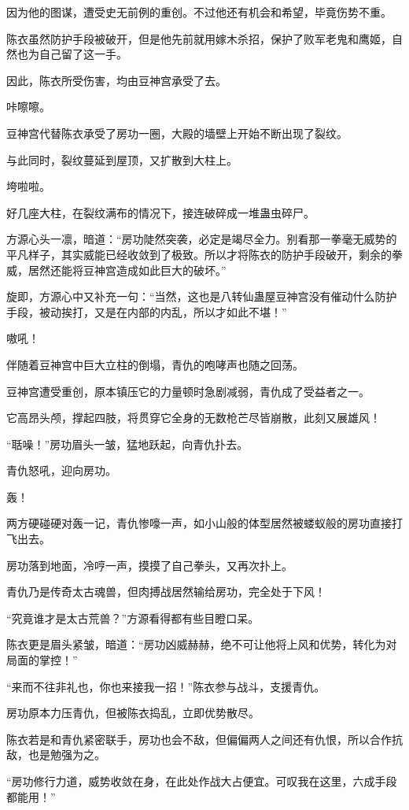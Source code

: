 \begin{this_body}
因为他的图谋，遭受史无前例的重创。不过他还有机会和希望，毕竟伤势不重。

陈衣虽然防护手段被破开，但是他先前就用嫁木杀招，保护了败军老鬼和鹰姬，自然也为自己留了这一手。

因此，陈衣所受伤害，均由豆神宫承受了去。

咔嚓嚓。

豆神宫代替陈衣承受了房功一圈，大殿的墙壁上开始不断出现了裂纹。

与此同时，裂纹蔓延到屋顶，又扩散到大柱上。

垮啦啦。

好几座大柱，在裂纹满布的情况下，接连破碎成一堆蛊虫碎尸。

方源心头一凛，暗道：“房功陡然突袭，必定是竭尽全力。别看那一拳毫无威势的平凡样子，其实威能已经收敛到了极致。所以才将陈衣的防护手段破开，剩余的拳威，居然还能将豆神宫造成如此巨大的破坏。”

旋即，方源心中又补充一句：“当然，这也是八转仙蛊屋豆神宫没有催动什么防护手段，被动挨打，又是在内部的内乱，所以才如此不堪！”

嗷吼！

伴随着豆神宫中巨大立柱的倒塌，青仇的咆哮声也随之回荡。

豆神宫遭受重创，原本镇压它的力量顿时急剧减弱，青仇成了受益者之一。

它高昂头颅，撑起四肢，将贯穿它全身的无数枪芒尽皆崩散，此刻又展雄风！

“聒噪！”房功眉头一皱，猛地跃起，向青仇扑去。

青仇怒吼，迎向房功。

轰！

两方硬碰硬对轰一记，青仇惨嚎一声，如小山般的体型居然被蝼蚁般的房功直接打飞出去。

房功落到地面，冷哼一声，摸摸了自己拳头，又再次扑上。

青仇乃是传奇太古魂兽，但肉搏战居然输给房功，完全处于下风！

“究竟谁才是太古荒兽？”方源看得都有些目瞪口呆。

陈衣更是眉头紧皱，暗道：“房功凶威赫赫，绝不可让他将上风和优势，转化为对局面的掌控！”

“来而不往非礼也，你也来接我一招！”陈衣参与战斗，支援青仇。

房功原本力压青仇，但被陈衣捣乱，立即优势散尽。

陈衣若是和青仇紧密联手，房功也会不敌，但偏偏两人之间还有仇恨，所以合作抗敌，也是勉强为之。

“房功修行力道，威势收敛在身，在此处作战大占便宜。可叹我在这里，六成手段都能用！”


\end{this_body}
